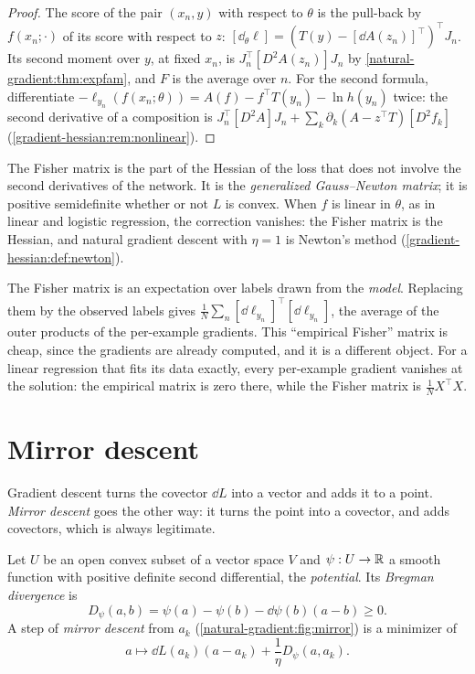 \begin{notechapter}
\begin{proof}
The score of the pair $(x_n, y)$ with respect to $\theta$ is the
pull-back by $f(x_n; \cdot)$ of its score with respect to $z$:
$[\dd_\theta\ell] = (T(y) - [\dd A(z_n)]^\top)^\top J_n$. Its second
moment over $y$, at fixed $x_n$, is $J_n^\top[D^2A(z_n)]J_n$ by
\cref{natural-gradient:thm:expfam}, and $F$ is the average over $n$. For
the second formula, differentiate
$-\ell_{y_n}(f(x_n; \theta))
= A(f) - f^\top T(y_n) - \ln h(y_n)$ twice:
the second derivative of a composition is
$J_n^\top[D^2A]J_n + \sum_k\partial_k(A - z^\top T)[D^2f_k]$
(\cref{gradient-hessian:rem:nonlinear}).
\end{proof}

The Fisher matrix is the part of the Hessian of the loss that does not
involve the second derivatives of the network. It is the
\emph{generalized Gauss--Newton matrix}; it is positive semidefinite
whether or not $L$ is convex. When $f$ is linear in $\theta$, as in
linear and logistic regression, the correction vanishes: the Fisher
matrix is the Hessian, and natural gradient descent with $\eta = 1$ is
Newton's method (\cref{gradient-hessian:def:newton}).

\begin{pitfall}
The Fisher matrix is an expectation over labels drawn from the
\emph{model}. Replacing them by the observed labels gives
$\frac1N\sum_n[\dd\ell_{y_n}]^\top[\dd\ell_{y_n}]$, the average of the
outer products of the per-example gradients. This ``empirical Fisher''
matrix is cheap, since the gradients are already computed, and it is a
different object. For a linear regression that fits its data exactly,
every per-example gradient vanishes at the solution: the empirical matrix
is zero there, while the Fisher matrix is $\frac1NX^\top X$.
\end{pitfall}

\section{Mirror descent}\label{natural-gradient:sec:mirror}

Gradient descent turns the covector $\dd L$ into a vector and adds it to
a point. \emph{Mirror descent} goes the other way: it turns the point
into a covector, and adds covectors, which is always legitimate.

\begin{definition}\label{natural-gradient:def:mirror}
Let $U$ be an open convex subset of a vector space $V$ and
$\psi:U\to\mathbb{R}$ a smooth function with positive definite second
differential, the \emph{potential}. Its \emph{Bregman divergence} is
\[
  D_\psi(a, b) = \psi(a) - \psi(b) - \dd\psi(b)(a - b)\geq0 .
\]
A step of \emph{mirror descent} from $a_k$
(\cref{natural-gradient:fig:mirror}) is a minimizer of
\[
  a\mapsto\dd L(a_k)(a - a_k) + \frac1\eta D_\psi(a, a_k) .
\]
\end{definition}


\end{notechapter}
